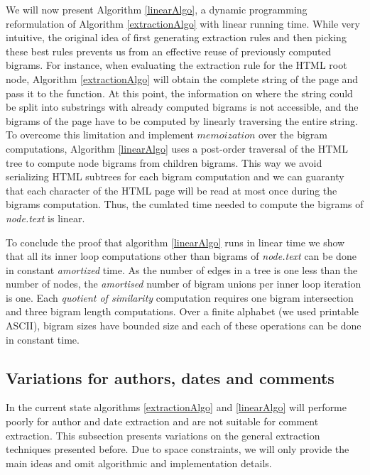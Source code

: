 We will now present Algorithm \ref{linearAlgo}, a dynamic programming reformulation of Algorithm \ref{extractionAlgo} with linear running time. While very intuitive, the original idea of first generating extraction rules and then picking these best rules prevents us from an effective reuse of previously computed bigrams. For instance, when evaluating the extraction rule for the HTML root node, Algorithm \ref{extractionAlgo} will obtain the complete string of the page and pass it to the  function. At this point, the information on where the string could be split into substrings with already computed bigrams is not accessible, and the bigrams of the page have to be computed by linearly traversing the entire string. To overcome this limitation and implement $memoization$ over the bigram computations, Algorithm \ref{linearAlgo} uses a post-order traversal of the HTML tree to compute node bigrams from children bigrams. This way we avoid serializing HTML subtrees for each bigram computation and we can guaranty that each character of the HTML page will be read at most once during the bigrams computation. Thus, the cumlated time needed to compute the bigrams of \emph{node.text} is linear.

To conclude the proof that algorithm \ref{linearAlgo} runs in linear time we show that all its inner loop computations other than bigrams of \emph{node.text} can be done in constant \emph{amortized} time. As the number of edges in a tree is one less than the number of nodes, the \emph{amortised} number of bigram unions per inner loop iteration is one. Each \emph{quotient of similarity} computation requires one bigram intersection and three bigram length computations. Over a finite alphabet (we used printable ASCII), bigram sizes have bounded size and each of these operations can be done in constant time.

\subsection{Variations for authors, dates and comments}
In the current state algorithms \ref{extractionAlgo} and \ref{linearAlgo} will performe poorly for author and date extraction and are not suitable for comment extraction. This subsection presents variations on the general extraction techniques presented before. Due to space constraints, we will only provide the main ideas and omit algorithmic and implementation details.

